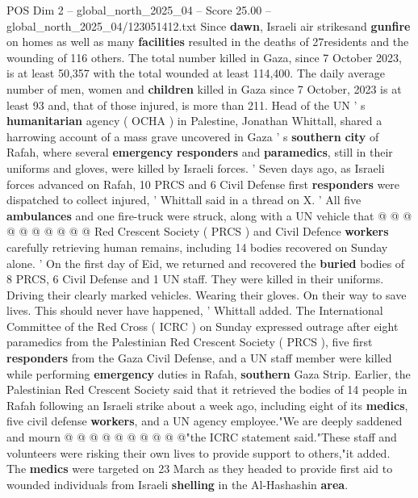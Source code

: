 \begin{textsample}{POS Dim 2 – global\_north\_2025\_04 – Score 25.00 – global\_north\_2025\_04/123051412.txt}  \label{ex:f2_pos_330}
Since \textbf{dawn}, Israeli air strikesand \textbf{gunfire} on homes as well as many \textbf{facilities} resulted in the deaths of 27residents and the wounding of 116 others.
The total number killed in Gaza, since 7 October 2023, is at least 50,357 with the total wounded at least 114,400.
The daily average number of men, women and \textbf{children} killed in Gaza since 7 October, 2023 is at least 93 and, that of those injured, is more than 211.
Head of the UN ' s \textbf{humanitarian} agency ( OCHA ) in Palestine, Jonathan Whittall, shared a harrowing account of a mass grave uncovered in Gaza ' s \textbf{southern} \textbf{city} of Rafah, where several \textbf{emergency} \textbf{responders} and \textbf{paramedics}, still in their uniforms and gloves, were killed by Israeli forces. ' Seven days ago, as Israeli forces advanced on Rafah, 10 PRCS and 6 Civil Defense first \textbf{responders} were dispatched to collect injured, ' Whittall said in a thread on X. ' All five \textbf{ambulances} and one fire-truck were struck, along with a UN vehicle that @ @ @ @ @ @ @ @ @ @ Red Crescent Society ( PRCS ) and Civil Defence \textbf{workers} carefully retrieving human remains, including 14 bodies recovered on Sunday alone. ' On the first day of Eid, we returned and recovered the \textbf{buried} bodies of 8 PRCS, 6 Civil Defense and 1 UN staff.
They were killed in their uniforms.
Driving their clearly marked vehicles.
Wearing their gloves.
On their way to save lives.
This should never have happened, ' Whittall added.
The International Committee of the Red Cross ( ICRC ) on Sunday expressed outrage after eight paramedics from the Palestinian Red Crescent Society ( PRCS ), five first \textbf{responders} from the Gaza Civil Defense, and a UN staff member were killed while performing \textbf{emergency} duties in Rafah, \textbf{southern} Gaza Strip.
Earlier, the Palestinian Red Crescent Society said that it retrieved the bodies of 14 people in Rafah following an Israeli strike about a week ago, including eight of its \textbf{medics}, five civil defense \textbf{workers}, and a UN agency employee."We are deeply saddened and mourn @ @ @ @ @ @ @ @ @ @"the ICRC statement said."These staff and volunteers were risking their own lives to provide support to others,"it added.
The \textbf{medics} were targeted on 23 March as they headed to provide first aid to wounded individuals from Israeli \textbf{shelling} in the Al-Hashashin \textbf{area}.

\end{textsample}
